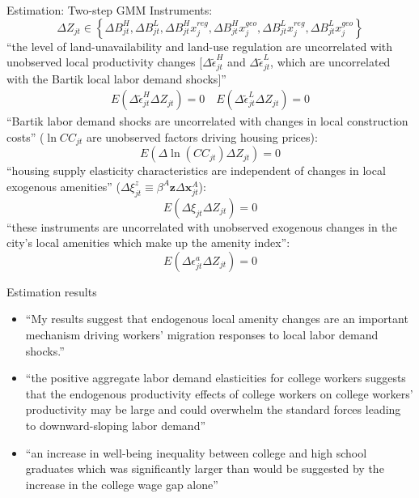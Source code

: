 \documentclass[10pt,notes=hide]{beamer}
\begin{document}
\begin{frame}[plain]{Estimation: Two-step GMM}
{\small
Instruments:
\begin{equation*}
\Delta Z_{jt} \in \left\{
\Delta B^{H}_{jt}, 
\Delta B^{L}_{jt}, 
\Delta B^{H}_{jt} x^{reg}_{j}, 
\Delta B^{H}_{jt} x^{geo}_{j}, 
\Delta B^{L}_{jt} x^{reg}_{j}, 
\Delta B^{L}_{jt} x^{geo}_{j}
\right\}
\end{equation*}
``the level of land-unavailability and land-use regulation are uncorrelated with unobserved local productivity changes [$\Delta \tilde{\epsilon}_{jt}^{H}$ and $\Delta \tilde{\epsilon}_{jt}^{L}$, which are uncorrelated with the Bartik local labor demand shocks]''
\begin{align*}
E \left(\Delta \tilde{\epsilon}_{jt}^{H} \Delta Z_{jt}\right) = 0 
\quad
E \left(\Delta \tilde{\epsilon}_{jt}^{L} \Delta Z_{jt}\right) = 0 
\end{align*}
``Bartik labor demand shocks are uncorrelated with changes in local construction costs'' ($\ln CC_{jt}$ are unobserved factors driving housing prices):
$$
E\left(\Delta \ln(CC_{jt}) \Delta Z_{jt}\right) = 0
$$
``housing supply elasticity characteristics are independent of changes in local exogenous amenities'' ($\Delta \xi^z_{jt} \equiv \beta^A \mathbf{z}\Delta\mathbf{x}_{jt}^{A}$):
$$
E\left(\Delta \xi_{jt} \Delta Z_{jt}\right) = 0
$$
``these instruments are uncorrelated with unobserved exogenous changes
in the city’s local amenities which make up the amenity index'':
$$
E\left(\Delta \epsilon_{jt}^{a} \Delta Z_{jt}\right) = 0
$$
}
\end{frame}
\begin{frame}{Estimation results}
\begin{itemize}
	\item ``My results suggest that endogenous local amenity changes are an important mechanism driving workers' migration responses to local labor demand shocks.''
	\item ``the positive aggregate labor demand elasticities for college workers suggests that the endogenous productivity effects of college workers on college workers' productivity may be large and could overwhelm the standard forces leading to downward-sloping labor demand''
	\item ``an increase in well-being inequality between college and high school graduates which was significantly larger than would be suggested by the increase in the college wage gap alone''
\end{itemize}
\end{frame}
\end{document}
